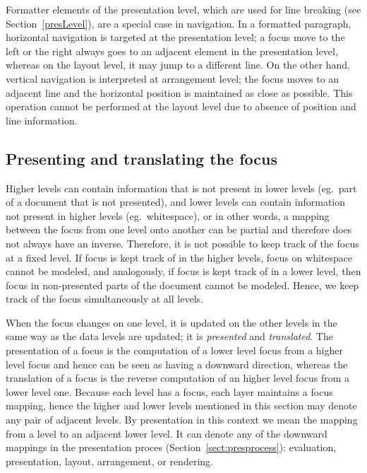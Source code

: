 
Formatter elements of the presentation level, which are used for line breaking (see Section~\ref{presLevel}), are a special case in navigation. In a formatted paragraph, horizontal navigation is targeted at the presentation level; a focus move to the left or the right always goes to an adjacent element in the presentation level, whereas on the layout level, it may jump to a different line. On the other hand, vertical navigation is interpreted at arrangement level; the focus moves to an adjacent line and the horizontal position is maintained as close as possible. This operation cannot be performed at the layout level due to absence of position and line information. 
 
 
%																
\subsection{Presenting and translating the focus}

Higher levels can contain information that is not present in lower levels (eg.\ part of a document that is not presented), and lower levels can contain information not present in higher levels (eg.\ whitespace), or in other words, a mapping between the focus from one level onto another can be partial and therefore does not always have an inverse. Therefore, it is not possible to keep track of the focus at a fixed level. If focus is kept track of in the higher levels, focus on whitespace cannot be modeled, and analogously, if focus is kept track of in a lower level, then focus in non-presented parts of the document cannot be modeled. Hence, we keep track of the focus simultaneously at all levels. 

When the focus changes on one level, it is updated on the other levels in the same way as the data levels are updated; it is {\em presented} and {\em translated}. The presentation of a focus is the computation of a lower level focus from a higher level focus and hence can be seen as having a downward direction, whereas the translation of a focus is the reverse computation of an higher level focus from a lower level one. Because each level has a focus, each layer maintains a focus mapping, hence the higher and lower levels mentioned in this section may denote any pair of adjacent levels. By presentation in this context we mean the mapping from a level to an adjacent lower level. It can denote any of the downward mappings in the presentation proces (Section~\ref{sect:presprocess}): evaluation, presentation, layout, arrangement, or rendering.

